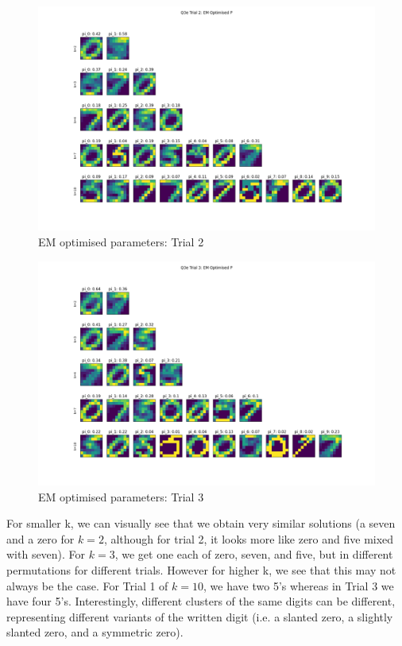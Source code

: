 \documentclass[12pt]{article}
\begin{document}
\begin{enumerate}
\begin{figure}[h]
  \centering
  \includegraphics[scale=0.3]{outputs/q3/q3e-2-optimised-p}
  \caption{EM optimised parameters: Trial 2}
  \label{fig:3e-initialised-p-trial-2}
\end{figure}
\begin{figure}[h]
  \centering
  \includegraphics[scale=0.3]{outputs/q3/q3e-3-optimised-p}
  \caption{EM optimised parameters: Trial 3}
  \label{fig:3e-initialised-p-trial-3}
\end{figure}


For smaller k, we can visually see that we obtain very similar solutions (a seven and a zero for $k=2$, although for trial 2, it looks more like zero and five mixed with seven). For $k=3$, we get one each of zero, seven, and five, but in different permutations for different trials. However for higher k, we see that this may not always be the case. For Trial 1 of $k=10$, we have two 5's whereas in Trial 3 we have four 5's. Interestingly, different clusters of the same digits can be different, representing different variants of the written digit (i.e. a slanted zero, a slightly slanted zero, and a symmetric zero).


\end{enumerate}
\end{document}
